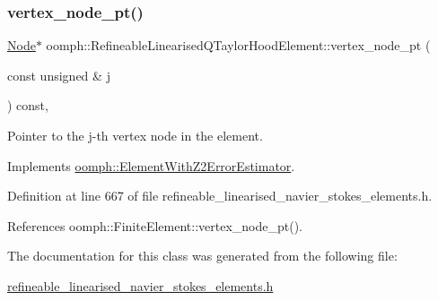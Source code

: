 \subsubsection{\texorpdfstring{vertex\+\_\+node\+\_\+pt()}{vertex\_node\_pt()}}
{\footnotesize\ttfamily \hyperlink{classoomph_1_1Node}{Node}$\ast$ oomph\+::\+Refineable\+Linearised\+Q\+Taylor\+Hood\+Element\+::vertex\+\_\+node\+\_\+pt (\begin{DoxyParamCaption}\item[{const unsigned \&}]{j }\end{DoxyParamCaption}) const\hspace{0.3cm}{\ttfamily [inline]}, {\ttfamily [virtual]}}



Pointer to the j-\/th vertex node in the element. 



Implements \hyperlink{classoomph_1_1ElementWithZ2ErrorEstimator_a0eedccc33519f852c5dc2055ddf2774b}{oomph\+::\+Element\+With\+Z2\+Error\+Estimator}.



Definition at line 667 of file refineable\+\_\+linearised\+\_\+navier\+\_\+stokes\+\_\+elements.\+h.



References oomph\+::\+Finite\+Element\+::vertex\+\_\+node\+\_\+pt().



The documentation for this class was generated from the following file\+:\begin{DoxyCompactItemize}
\item 
\hyperlink{refineable__linearised__navier__stokes__elements_8h}{refineable\+\_\+linearised\+\_\+navier\+\_\+stokes\+\_\+elements.\+h}\end{DoxyCompactItemize}
